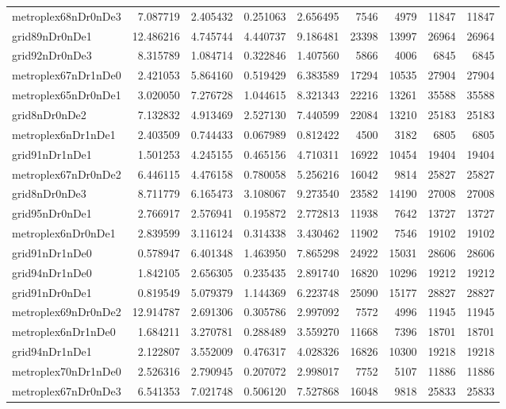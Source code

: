 \begin{longtable}{|l|r|r|r|r|r|r|r|r|}
metroplex68nDr0nDe3 & 7.087719 & 2.405432 & 0.251063 & 2.656495 & 7546 & 4979 & 11847 & 11847 \\
grid89nDr0nDe1 & 12.486216 & 4.745744 & 4.440737 & 9.186481 & 23398 & 13997 & 26964 & 26964 \\
grid92nDr0nDe3 & 8.315789 & 1.084714 & 0.322846 & 1.407560 & 5866 & 4006 & 6845 & 6845 \\
metroplex67nDr1nDe0 & 2.421053 & 5.864160 & 0.519429 & 6.383589 & 17294 & 10535 & 27904 & 27904 \\
metroplex65nDr0nDe1 & 3.020050 & 7.276728 & 1.044615 & 8.321343 & 22216 & 13261 & 35588 & 35588 \\
grid8nDr0nDe2 & 7.132832 & 4.913469 & 2.527130 & 7.440599 & 22084 & 13210 & 25183 & 25183 \\
metroplex6nDr1nDe1 & 2.403509 & 0.744433 & 0.067989 & 0.812422 & 4500 & 3182 & 6805 & 6805 \\
grid91nDr1nDe1 & 1.501253 & 4.245155 & 0.465156 & 4.710311 & 16922 & 10454 & 19404 & 19404 \\
metroplex67nDr0nDe2 & 6.446115 & 4.476158 & 0.780058 & 5.256216 & 16042 & 9814 & 25827 & 25827 \\
grid8nDr0nDe3 & 8.711779 & 6.165473 & 3.108067 & 9.273540 & 23582 & 14190 & 27008 & 27008 \\
grid95nDr0nDe1 & 2.766917 & 2.576941 & 0.195872 & 2.772813 & 11938 & 7642 & 13727 & 13727 \\
metroplex6nDr0nDe1 & 2.839599 & 3.116124 & 0.314338 & 3.430462 & 11902 & 7546 & 19102 & 19102 \\
grid91nDr1nDe0 & 0.578947 & 6.401348 & 1.463950 & 7.865298 & 24922 & 15031 & 28606 & 28606 \\
grid94nDr1nDe0 & 1.842105 & 2.656305 & 0.235435 & 2.891740 & 16820 & 10296 & 19212 & 19212 \\
grid91nDr0nDe1 & 0.819549 & 5.079379 & 1.144369 & 6.223748 & 25090 & 15177 & 28827 & 28827 \\
metroplex69nDr0nDe2 & 12.914787 & 2.691306 & 0.305786 & 2.997092 & 7572 & 4996 & 11945 & 11945 \\
metroplex6nDr1nDe0 & 1.684211 & 3.270781 & 0.288489 & 3.559270 & 11668 & 7396 & 18701 & 18701 \\
grid94nDr1nDe1 & 2.122807 & 3.552009 & 0.476317 & 4.028326 & 16826 & 10300 & 19218 & 19218 \\
metroplex70nDr1nDe0 & 2.526316 & 2.790945 & 0.207072 & 2.998017 & 7752 & 5107 & 11886 & 11886 \\
metroplex67nDr0nDe3 & 6.541353 & 7.021748 & 0.506120 & 7.527868 & 16048 & 9818 & 25833 & 25833 \\

\end{longtable}
